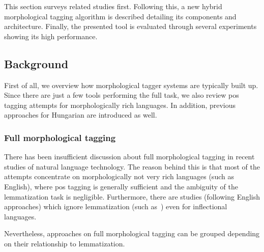 This section surveys related studies first. 
Following this, a new hybrid morphological tagging algorithm is described detailing its components and architecture. 
Finally, the presented tool is evaluated through several experiments showing its high performance.

\subsection{Background}

First of all, we overview how morphological tagger systems are typically built up. 
Since there are just a few tools performing the full task, we also review \gls{pos} tagging attempts for morphologically rich languages. 
In addition, previous approaches for Hungarian are introduced as well. %

\subsubsection{Full morphological tagging}

There has been insufficient discussion about full morphological tagging in recent studies of natural language technology. 
The reason behind this is that most of the attempts concentrate on morphologically not very rich languages (such as English), where \gls{pos} tagging is generally sufficient and the ambiguity of the lemmatization task is negligible. 
Furthermore, there are studies (following English approaches) which ignore lemmatization (such as~\cite{Hajic1998a,Tufis1998,Silfverberg2011}) even for inflectional languages. 

Nevertheless, approaches on full morphological tagging can be grouped depending on their relationship to lemmatization.

